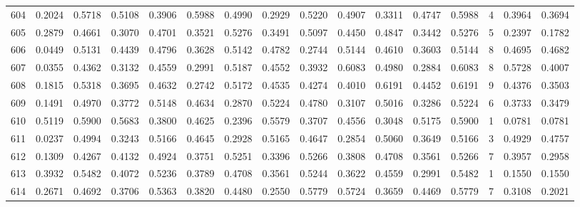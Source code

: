 \begin{tabular}{lrrrrrrrrrrrrrrr}
604 &      0.2024 &  0.5718 &  0.5108 &  0.3906 &  0.5988 &  0.4990 &  0.2929 &  0.5220 &  0.4907 &  0.3311 &   0.4747 &     0.5988 &      4 &                    0.3964 &                     0.3694 \\
605 &      0.2879 &  0.4661 &  0.3070 &  0.4701 &  0.3521 &  0.5276 &  0.3491 &  0.5097 &  0.4450 &  0.4847 &   0.3442 &     0.5276 &      5 &                    0.2397 &                     0.1782 \\
606 &      0.0449 &  0.5131 &  0.4439 &  0.4796 &  0.3628 &  0.5142 &  0.4782 &  0.2744 &  0.5144 &  0.4610 &   0.3603 &     0.5144 &      8 &                    0.4695 &                     0.4682 \\
607 &      0.0355 &  0.4362 &  0.3132 &  0.4559 &  0.2991 &  0.5187 &  0.4552 &  0.3932 &  0.6083 &  0.4980 &   0.2884 &     0.6083 &      8 &                    0.5728 &                     0.4007 \\
608 &      0.1815 &  0.5318 &  0.3695 &  0.4632 &  0.2742 &  0.5172 &  0.4535 &  0.4274 &  0.4010 &  0.6191 &   0.4452 &     0.6191 &      9 &                    0.4376 &                     0.3503 \\
609 &      0.1491 &  0.4970 &  0.3772 &  0.5148 &  0.4634 &  0.2870 &  0.5224 &  0.4780 &  0.3107 &  0.5016 &   0.3286 &     0.5224 &      6 &                    0.3733 &                     0.3479 \\
610 &      0.5119 &  0.5900 &  0.5683 &  0.3800 &  0.4625 &  0.2396 &  0.5579 &  0.3707 &  0.4556 &  0.3048 &   0.5175 &     0.5900 &      1 &                    0.0781 &                     0.0781 \\
611 &      0.0237 &  0.4994 &  0.3243 &  0.5166 &  0.4645 &  0.2928 &  0.5165 &  0.4647 &  0.2854 &  0.5060 &   0.3649 &     0.5166 &      3 &                    0.4929 &                     0.4757 \\
612 &      0.1309 &  0.4267 &  0.4132 &  0.4924 &  0.3751 &  0.5251 &  0.3396 &  0.5266 &  0.3808 &  0.4708 &   0.3561 &     0.5266 &      7 &                    0.3957 &                     0.2958 \\
613 &      0.3932 &  0.5482 &  0.4072 &  0.5236 &  0.3789 &  0.4708 &  0.3561 &  0.5244 &  0.3622 &  0.4559 &   0.2991 &     0.5482 &      1 &                    0.1550 &                     0.1550 \\
614 &      0.2671 &  0.4692 &  0.3706 &  0.5363 &  0.3820 &  0.4480 &  0.2550 &  0.5779 &  0.5724 &  0.3659 &   0.4469 &     0.5779 &      7 &                    0.3108 &                     0.2021 \\

\end{tabular}
